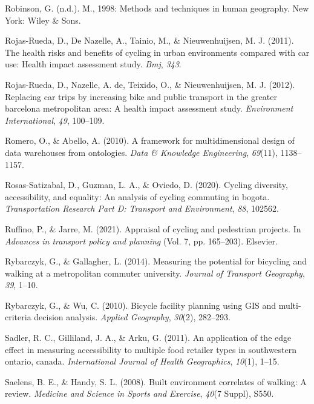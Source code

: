 \documentclass[
11pt, %
oneside, %
english, %
singlespacing, %
]{macthesis} %
\newlength{\cslhangindent}
\newenvironment{CSLReferences}[2] %
{\begin{list}{}{%
	\setlength{\itemindent}{0pt}
	\setlength{\leftmargin}{0pt}
	\setlength{\parsep}{0pt}
	\ifodd #1
	\setlength{\leftmargin}{\cslhangindent}
	\setlength{\itemindent}{-1\cslhangindent}
	\fi
	\setlength{\itemsep}{#2\baselineskip}}}
{\end{list}}
\begin{document}
\begin{CSLReferences}{1}{0}
Robinson, G. (n.d.). M., 1998: Methods and techniques in human geography. New York: Wiley \& Sons.

Rojas-Rueda, D., De Nazelle, A., Tainio, M., \& Nieuwenhuijsen, M. J. (2011). The health risks and benefits of cycling in urban environments compared with car use: Health impact assessment study. \emph{Bmj}, \emph{343}.

Rojas-Rueda, D., Nazelle, A. de, Teixido, O., \& Nieuwenhuijsen, M. J. (2012). Replacing car trips by increasing bike and public transport in the greater barcelona metropolitan area: A health impact assessment study. \emph{Environment International}, \emph{49}, 100--109.

Romero, O., \& Abello, A. (2010). A framework for multidimensional design of data warehouses from ontologies. \emph{Data \& Knowledge Engineering}, \emph{69}(11), 1138--1157.

Rosas-Satizabal, D., Guzman, L. A., \& Oviedo, D. (2020). Cycling diversity, accessibility, and equality: An analysis of cycling commuting in bogota. \emph{Transportation Research Part D: Transport and Environment}, \emph{88}, 102562.

Ruffino, P., \& Jarre, M. (2021). Appraisal of cycling and pedestrian projects. In \emph{Advances in transport policy and planning} (Vol. 7, pp. 165--203). Elsevier.

Rybarczyk, G., \& Gallagher, L. (2014). Measuring the potential for bicycling and walking at a metropolitan commuter university. \emph{Journal of Transport Geography}, \emph{39}, 1--10.

Rybarczyk, G., \& Wu, C. (2010). Bicycle facility planning using GIS and multi-criteria decision analysis. \emph{Applied Geography}, \emph{30}(2), 282--293.

Sadler, R. C., Gilliland, J. A., \& Arku, G. (2011). An application of the edge effect in measuring accessibility to multiple food retailer types in southwestern ontario, canada. \emph{International Journal of Health Geographics}, \emph{10}(1), 1--15.

Saelens, B. E., \& Handy, S. L. (2008). Built environment correlates of walking: A review. \emph{Medicine and Science in Sports and Exercise}, \emph{40}(7 Suppl), S550.


\end{CSLReferences}
\end{document}
